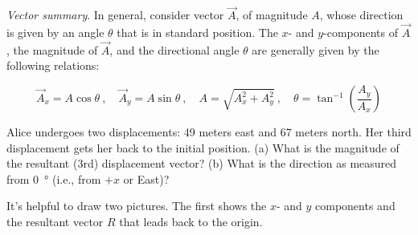 \documentclass[main.tex]{subfiles}
\begin{document}
\begin{mdframed}[backgroundcolor=black!10]
\textit{Vector summary}. In general, consider vector $\vec{A}$, of magnitude $A$, whose direction is given by an angle $\theta$ that is in standard position. The $x$- and $y$-components of $\vec{A}$, the magnitude of $\vec{A}$, and the directional angle $\theta$ are generally given by the following relations: 

\begin{equation*}
    \vec{A}_x = A \cos{\theta}\ , \hspace{1em}
    \vec{A}_y = A \sin{\theta}\ , \hspace{1em}
    A = \sqrt{A_x^2 + A_y^2}\ , \hspace{1em}
    \theta = \tan^{-1}\left(\frac{A_y}{A_x}\right)
\end{equation*}
\end{mdframed}

\begin{figure}[h!]
    \centering
    \pgfplotsset{compat=1.11}
    \def\A{6}
    \def\angle{55}
\end{figure}

\begin{example}
    Alice undergoes two displacements: 49 meters east and 67 meters north. Her third displacement gets her back to the initial position. (a) What is the magnitude of the resultant (3rd) displacement vector? (b) What is the direction as measured from \SI{0}{\degree} (i.e., from $+x$ or East)?
\end{example}

\Solution It's helpful to draw two pictures. The first shows the $x$- and $y$ components and the resultant vector $R$ that leads back to the origin.
\end{document}
